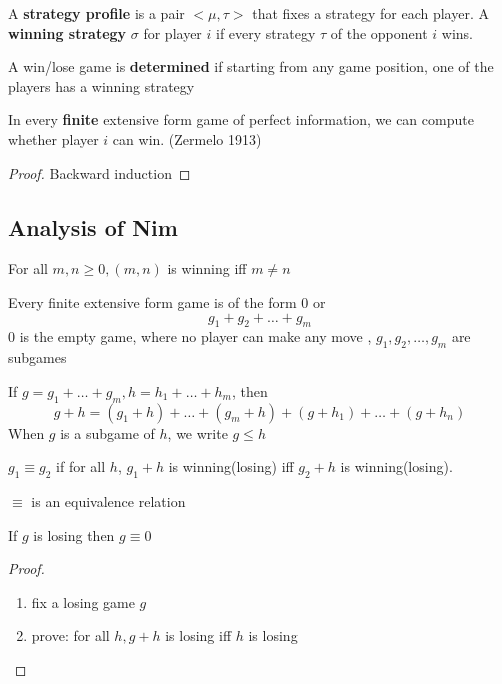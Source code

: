 \documentclass[11pt]{article}
\begin{document}
A \textbf{strategy profile} is a pair \(<\mu,\tau>\) that fixes a strategy for each
player. A \textbf{winning strategy} \(\sigma\) for player \(i\) if every strategy \(\tau\) of
the opponent \(i\) wins.


A win/lose game is \textbf{determined} if starting from any game position, one of the
players has a winning strategy


\begin{theorem}
In every \textbf{finite} extensive form game of perfect information, we can compute whether
player $i$ can win. (Zermelo 1913)
\end{theorem}
\begin{proof}
Backward induction
\end{proof}

\subsection{Analysis of Nim}
\label{sec:org160640a}
\begin{lemma}
For all $m,n\ge0, (m,n)$ is winning iff $m\neq n$
\end{lemma}

Every finite extensive form game is of the form \(0\) or
\begin{equation*}
g_1+g_2+\dots+g_m
\end{equation*}
0 is the empty game, where no player can make any move
, \(g_1,g_2,\dots,g_m\) are subgames


If \(g=g_1+\dots+g_m, h=h_1+\dots+h_m\), then
\begin{equation*}
g+h=(g_1+h)+\dots+(g_m+h)+(g+h_1)+\dots+(g+h_n)
\end{equation*}
When \(g\) is a subgame of \(h\), we write \(g\le h\)


\textbf{\(g_1\equiv g_2\)} if for all \(h\), \(g_1+h\) is winning(losing) iff \(g_2+h\) is
winning(losing).


\(\equiv\) is an equivalence relation


\begin{lemma}\leavevmode
If $g$ is losing then $g\equiv 0$
\end{lemma}

\begin{proof}
\;\par
\begin{enumerate}
\item fix a losing game $g$
\item prove: for all $h, g+h$ is losing iff $h$ is losing
\end{enumerate}
\end{proof}
\end{document}
